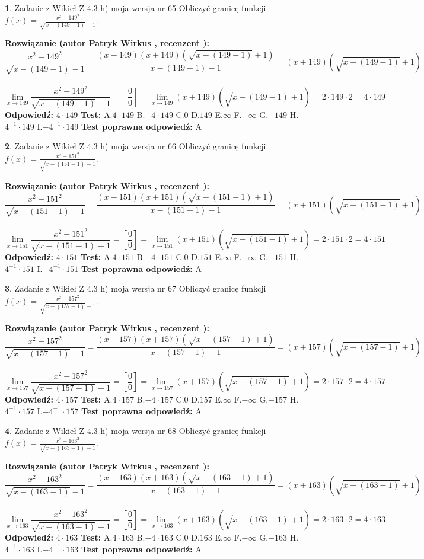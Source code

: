 \documentclass[12pt, a4paper]{article}
\theoremstyle{definition} %
\newtheorem{zad}{}
\newcommand{\zadStart}[1]{\begin{zad}#1\newline}
\newcommand{\zadStop}{\end{zad}}
\newcommand{\rozwStart}[2]{\noindent \textbf{Rozwiązanie (autor #1 , recenzent #2): }\newline}
\newcommand{\rozwStop}{\newline}
\newcommand{\odpStart}{\noindent \textbf{Odpowiedź:}\newline}
\newcommand{\odpStop}{\newline}
\newcommand{\testStart}{\noindent \textbf{Test:}\newline}
\newcommand{\testStop}{\newline}
\newcommand{\kluczStart}{\noindent \textbf{Test poprawna odpowiedź:}\newline}
\newcommand{\kluczStop}{\newline}
\begin{document}
\zadStart{Zadanie z Wikieł Z 4.3 h) moja wersja nr 65}
Obliczyć granicę funkcji $f(x)=\frac{x^{2} - 149^{2}}{\sqrt{x-(149-1)}-1}$.
\zadStop
\rozwStart{Patryk Wirkus}{}
$$\frac{x^{2} - 149^{2}}{\sqrt{x-(149-1)}-1}=\frac{(x-149)(x+149)(\sqrt{x-(149-1)}+1)}{x-(149-1)-1}=(x+149)(\sqrt{x-(149-1)}+1)$$
\\
$$\lim\limits_{x\to 149}\frac{x^{2} - 149^{2}}{\sqrt{x-(149-1)}-1}=[\frac{0}{0}]=
\lim\limits_{x\to 149}(x+149)(\sqrt{x-(149-1)}+1) = 2\cdot149 \cdot 2 = 4 \cdot 149$$
\rozwStop
\odpStart
$4\cdot149$
\odpStop
\testStart
A.$4\cdot149$
B.$-4\cdot149$
C.$0$
D.$149$
E.$\infty$
F.$-\infty$
G.$-149$
H.$4^{-1}\cdot149$
I.$-4^{-1}\cdot149$
\testStop
\kluczStart
A
\kluczStop



\zadStart{Zadanie z Wikieł Z 4.3 h) moja wersja nr 66}
Obliczyć granicę funkcji $f(x)=\frac{x^{2} - 151^{2}}{\sqrt{x-(151-1)}-1}$.
\zadStop
\rozwStart{Patryk Wirkus}{}
$$\frac{x^{2} - 151^{2}}{\sqrt{x-(151-1)}-1}=\frac{(x-151)(x+151)(\sqrt{x-(151-1)}+1)}{x-(151-1)-1}=(x+151)(\sqrt{x-(151-1)}+1)$$
\\
$$\lim\limits_{x\to 151}\frac{x^{2} - 151^{2}}{\sqrt{x-(151-1)}-1}=[\frac{0}{0}]=
\lim\limits_{x\to 151}(x+151)(\sqrt{x-(151-1)}+1) = 2\cdot151 \cdot 2 = 4 \cdot 151$$
\rozwStop
\odpStart
$4\cdot151$
\odpStop
\testStart
A.$4\cdot151$
B.$-4\cdot151$
C.$0$
D.$151$
E.$\infty$
F.$-\infty$
G.$-151$
H.$4^{-1}\cdot151$
I.$-4^{-1}\cdot151$
\testStop
\kluczStart
A
\kluczStop



\zadStart{Zadanie z Wikieł Z 4.3 h) moja wersja nr 67}
Obliczyć granicę funkcji $f(x)=\frac{x^{2} - 157^{2}}{\sqrt{x-(157-1)}-1}$.
\zadStop
\rozwStart{Patryk Wirkus}{}
$$\frac{x^{2} - 157^{2}}{\sqrt{x-(157-1)}-1}=\frac{(x-157)(x+157)(\sqrt{x-(157-1)}+1)}{x-(157-1)-1}=(x+157)(\sqrt{x-(157-1)}+1)$$
\\
$$\lim\limits_{x\to 157}\frac{x^{2} - 157^{2}}{\sqrt{x-(157-1)}-1}=[\frac{0}{0}]=
\lim\limits_{x\to 157}(x+157)(\sqrt{x-(157-1)}+1) = 2\cdot157 \cdot 2 = 4 \cdot 157$$
\rozwStop
\odpStart
$4\cdot157$
\odpStop
\testStart
A.$4\cdot157$
B.$-4\cdot157$
C.$0$
D.$157$
E.$\infty$
F.$-\infty$
G.$-157$
H.$4^{-1}\cdot157$
I.$-4^{-1}\cdot157$
\testStop
\kluczStart
A
\kluczStop



\zadStart{Zadanie z Wikieł Z 4.3 h) moja wersja nr 68}
Obliczyć granicę funkcji $f(x)=\frac{x^{2} - 163^{2}}{\sqrt{x-(163-1)}-1}$.
\zadStop
\rozwStart{Patryk Wirkus}{}
$$\frac{x^{2} - 163^{2}}{\sqrt{x-(163-1)}-1}=\frac{(x-163)(x+163)(\sqrt{x-(163-1)}+1)}{x-(163-1)-1}=(x+163)(\sqrt{x-(163-1)}+1)$$
\\
$$\lim\limits_{x\to 163}\frac{x^{2} - 163^{2}}{\sqrt{x-(163-1)}-1}=[\frac{0}{0}]=
\lim\limits_{x\to 163}(x+163)(\sqrt{x-(163-1)}+1) = 2\cdot163 \cdot 2 = 4 \cdot 163$$
\rozwStop
\odpStart
$4\cdot163$
\odpStop
\testStart
A.$4\cdot163$
B.$-4\cdot163$
C.$0$
D.$163$
E.$\infty$
F.$-\infty$
G.$-163$
H.$4^{-1}\cdot163$
I.$-4^{-1}\cdot163$
\testStop
\kluczStart
A
\kluczStop
\end{document}
